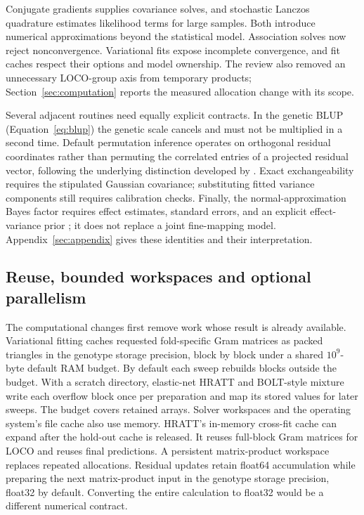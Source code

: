 \documentclass[11pt]{article}
\begin{document}
Conjugate gradients supplies covariance solves, and stochastic Lanczos
quadrature \citep{ubaru2017} estimates likelihood terms for large samples. Both introduce
numerical approximations beyond the statistical model. Association
solves now reject nonconvergence. Variational fits expose incomplete
convergence, and fit caches respect their options and model ownership.
The review also removed an unnecessary LOCO-group axis from temporary
products; Section~\ref{sec:computation} reports the measured allocation
change with its scope.

Several adjacent routines need equally explicit contracts. In the genetic
BLUP (Equation~\eqref{eq:blup}) the genetic scale cancels and must not be
multiplied in a second time. Default permutation inference
operates on orthogonal residual coordinates rather than permuting the
correlated entries of a projected residual vector, following the
underlying distinction developed by \citet{abney2015}. Exact exchangeability
requires the stipulated Gaussian covariance; substituting fitted
variance components still requires calibration checks. Finally, the
normal-approximation Bayes factor requires effect estimates, standard
errors, and an explicit effect-variance prior \citep{wakefield2009};
it does not replace a joint fine-mapping model. Appendix~\ref{sec:appendix}
gives these identities and their interpretation.

\subsection{Reuse, bounded workspaces and optional parallelism}
\label{sec:efficient-implementation}

The computational changes first remove work whose result is already
available. Variational fitting caches requested fold-specific Gram matrices
as packed triangles in the genotype storage precision, block by block under
a shared $10^9$-byte default RAM budget. By default each sweep rebuilds
blocks outside the budget. With a scratch directory, elastic-net HRATT
and BOLT-style mixture write each overflow block once per preparation
and map its stored values for later sweeps.
The budget covers retained arrays. Solver workspaces and the operating
system's file cache also use memory. HRATT's in-memory cross-fit cache can
expand after the hold-out cache is released. It reuses full-block Gram matrices for LOCO
and reuses final predictions. A persistent matrix-product workspace replaces repeated
allocations. Residual updates retain float64 accumulation while preparing
the next matrix-product input in the genotype storage precision, float32
by default. Converting the entire calculation to float32 would be a
different numerical contract.
\end{document}
